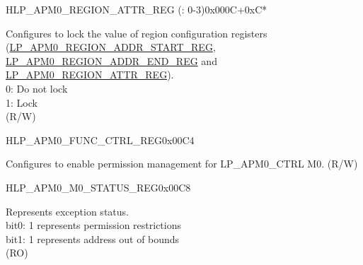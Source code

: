 \begin{register}{H}{LP\_APM0\_REGION\_ATTR\_REG (: 0-3)}{0x000C+0xC*}
\begin{regdesc}
\begin{reglist}
\label{fielddesc:LPAPM0REGIONNLOCK}\item [LP\_APM0\_REGION\regindex{n}\_LOCK] Configures to lock the value of region  configuration registers (\hyperref[regdesc:LPAPM0REGIONNADDRSTARTREG]{LP\_APM0\_REGION\_ADDR\_START\_REG}, \hyperref[regdesc:LPAPM0REGIONNADDRENDREG]{LP\_APM0\_REGION\_ADDR\_END\_REG} and \hyperref[regdesc:LPAPM0REGIONNATTRREG]{LP\_APM0\_REGION\_ATTR\_REG}).\\ 
0: Do not lock \\ 
1: Lock  \\ (R/W)
\end{reglist}\end{regdesc}
\end{register}


\begin{register}{H}{LP\_APM0\_FUNC\_CTRL\_REG}{0x00C4}\label{regdesc:LPAPM0FUNCCTRLREG}
%
%
\regnewline%
\begin{regdesc}\begin{reglist}
\label{fielddesc:LPAPM0M0FUNCEN}\item [LP\_APM0\_M0\_FUNC\_EN] Configures to enable permission management for LP\_APM0\_CTRL M0. (R/W)
\end{reglist}\end{regdesc}
\end{register}


\begin{register}{H}{LP\_APM0\_M0\_STATUS\_REG}{0x00C8}\label{regdesc:LPAPM0M0STATUSREG}
%
%
\regnewline%
\begin{regdesc}\begin{reglist}
\label{fielddesc:LPAPM0M0EXCEPTIONSTATUS}\item [LP\_APM0\_M0\_EXCEPTION\_STATUS] Represents exception status.\\ 
bit0: 1 represents permission restrictions \\ 
bit1: 1 represents address out of bounds  \\ 
(RO)
\end{reglist}\end{regdesc}
\end{register}


